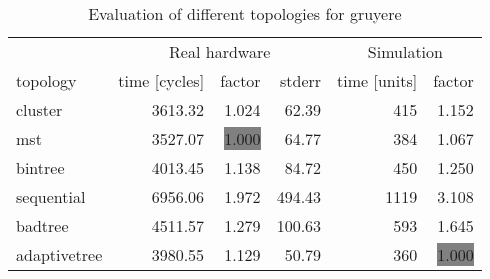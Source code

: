 \begin{table}[htb]
  \centering
  \begin{tabular}{lrrrrr}
  \toprule
  & \multicolumn{3}{c}{Real hardware} & \multicolumn{2}{c}{Simulation} \\
  topology & time [cycles] & factor & stderr & time [units] & factor \\
  \midrule
  cluster & 3613.32 & 1.024 & 62.39 & 415 & 1.152 \\
  mst & 3527.07 & \colorbox{gray}{1.000} & 64.77 & 384 & 1.067 \\
  bintree & 4013.45 & 1.138 & 84.72 & 450 & 1.250 \\
  sequential & 6956.06 & 1.972 & 494.43 & 1119 & 3.108 \\
  badtree & 4511.57 & 1.279 & 100.63 & 593 & 1.645 \\
  adaptivetree & 3980.55 & 1.129 & 50.79 & 360 & \colorbox{gray}{1.000} \\
  \midrule
  \end{tabular}
  \caption{Evaluation of different topologies for gruyere}
  \label{tab:gruyere}
\end{table}
